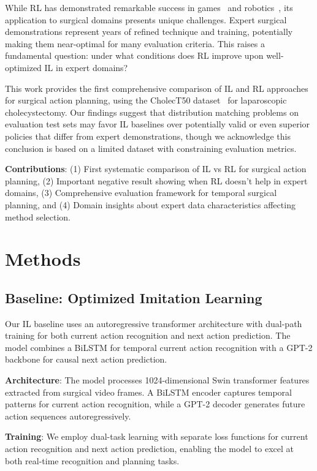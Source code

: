 \documentclass[runningheads]{llncs}
\begin{document}
While RL has demonstrated remarkable success in games~\cite{mnih2015human} and robotics~\cite{levine2016end}, its application to surgical domains presents unique challenges. Expert surgical demonstrations represent years of refined technique and training, potentially making them near-optimal for many evaluation criteria. This raises a fundamental question: under what conditions does RL improve upon well-optimized IL in expert domains?

This work provides the first comprehensive comparison of IL and RL approaches for surgical action planning, using the CholecT50 dataset~\cite{nwoye2022cholect50} for laparoscopic cholecystectomy. Our findings suggest that distribution matching problems on evaluation test sets may favor IL baselines over potentially valid or even superior policies that differ from expert demonstrations, though we acknowledge this conclusion is based on a limited dataset with constraining evaluation metrics.

\textbf{Contributions}: (1) First systematic comparison of IL vs RL for surgical action planning, (2) Important negative result showing when RL doesn't help in expert domains, (3) Comprehensive evaluation framework for temporal surgical planning, and (4) Domain insights about expert data characteristics affecting method selection.

\section{Methods}

\subsection{Baseline: Optimized Imitation Learning}

Our IL baseline uses an autoregressive transformer architecture with dual-path training for both current action recognition and next action prediction. The model combines a BiLSTM for temporal current action recognition with a GPT-2 backbone for causal next action prediction.

\textbf{Architecture}: The model processes 1024-dimensional Swin transformer features~\cite{liu2021swin} extracted from surgical video frames. A BiLSTM encoder captures temporal patterns for current action recognition, while a GPT-2 decoder generates future action sequences autoregressively.

\textbf{Training}: We employ dual-task learning with separate loss functions for current action recognition and next action prediction, enabling the model to excel at both real-time recognition and planning tasks.
\end{document}
